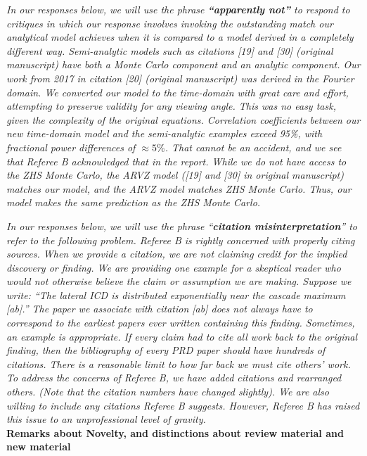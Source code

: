\documentclass[12pt]{article}
\begin{document}
\textit{In our responses below, we will use the phrase \textbf{``apparently not''} to respond to critiques in which our response involves invoking the outstanding match our analytical model achieves when it is compared to a model derived in a completely different way.  Semi-analytic models such as citations [19] and [30] (original manuscript) have both a Monte Carlo component and an analytic component.  Our work from 2017 in citation [20] (original manuscript) was derived in the Fourier domain.  We converted our model to the time-domain with great care and effort, attempting to preserve validity for any viewing angle.  This was no easy task, given the complexity of the original equations.  Correlation coefficients between our new time-domain model and the semi-analytic examples exceed 95\%, with fractional power differences of $\approx 5\%$.  That cannot be an accident, and we see that Referee B acknowledged that in the report.  While we do not have access to the ZHS Monte Carlo, the ARVZ model ([19] and [30] in original manuscript) matches our model, and the ARVZ model matches ZHS Monte Carlo.  Thus, our model makes the same prediction as the ZHS Monte Carlo.}

\textit{In our responses below, we will use the phrase ``\textbf{citation misinterpretation}'' to refer to the following problem.  Referee B is rightly concerned with properly citing sources.  When we provide a citation, we are not claiming credit for the implied discovery or finding.  We are providing one example for a skeptical reader who would not otherwise believe the claim or assumption we are making.  Suppose we write: ``The lateral ICD is distributed exponentially near the cascade maximum [ab].''  The paper we associate with citation [ab] does not always have to correspond to the earliest papers ever written containing this finding.  Sometimes, an example is appropriate.  If every claim had to cite all work back to the original finding, then the bibliography of every PRD paper should have hundreds of citations.  There is a reasonable limit to how far back we must cite others' work.  To address the concerns of Referee B, we have added citations and rearranged others.  (Note that the citation numbers have changed slightly).  We are also willing to include any citations Referee B suggests.  However, Referee B has raised this issue to an unprofessional level of gravity.} \\ 

\textbf{Remarks about Novelty, and distinctions about review material and new material} \\
\end{document}
